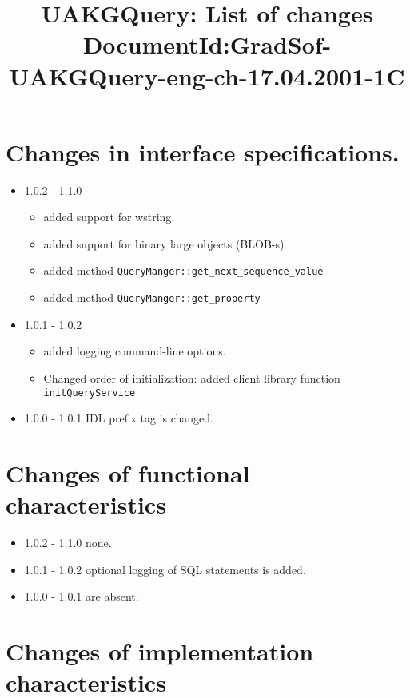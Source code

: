 \documentclass[10pt]{article}
\title{ UAKGQuery: List of changes \newline
        \small{DocumentId:GradSof-UAKGQuery-eng-ch-17.04.2001-1C}
      }
\begin{document}
\maketitle{}

\tableofcontents

\section{  Changes in interface specifications. }

\begin{itemize}
 \item 1.0.2 - 1.1.0 
    \begin{itemize}
       \item added support for wstring.
       \item added support for binary large objects (BLOB-s)
       \item added method \verb|QueryManger::get_next_sequence_value|
       \item added method \verb|QueryManger::get_property|
    \end{itemize}
 \item 1.0.1 - 1.0.2 
    \begin{itemize}
      \item added logging command-line options.
      \item Changed order of initialization: added client library function
            \verb|initQueryService|
     \end{itemize}
 \item 1.0.0 - 1.0.1 IDL prefix tag is changed.
\end{itemize}

\section{  Changes of functional characteristics }

\begin{itemize}
 \item 1.0.2 - 1.1.0 none.
 \item 1.0.1 - 1.0.2 optional logging of SQL statements is added.
 \item 1.0.0 - 1.0.1 are absent.
\end{itemize}

\section{  Changes of implementation characteristics }
\end{document}
